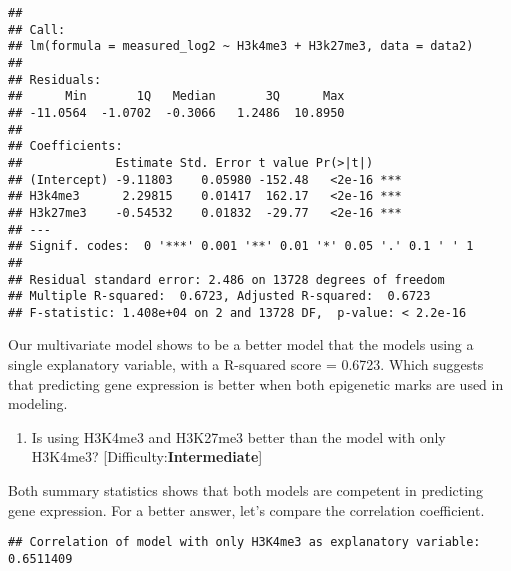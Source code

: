 \documentclass[
]{article}
\newenvironment{Shaded}{\begin{snugshade}}{\end{snugshade}}
\newcommand{\FunctionTok}[1]{\textcolor[rgb]{0.00,0.00,0.00}{#1}}
\newcommand{\NormalTok}[1]{#1}
\newcommand{\OtherTok}[1]{\textcolor[rgb]{0.56,0.35,0.01}{#1}}
\newcommand{\SpecialCharTok}[1]{\textcolor[rgb]{0.00,0.00,0.00}{#1}}
\newcommand{\StringTok}[1]{\textcolor[rgb]{0.31,0.60,0.02}{#1}}
\providecommand{\tightlist}{%
  \setlength{\itemsep}{0pt}\setlength{\parskip}{0pt}}
\begin{document}
\begin{verbatim}
## 
## Call:
## lm(formula = measured_log2 ~ H3k4me3 + H3k27me3, data = data2)
## 
## Residuals:
##      Min       1Q   Median       3Q      Max 
## -11.0564  -1.0702  -0.3066   1.2486  10.8950 
## 
## Coefficients:
##             Estimate Std. Error t value Pr(>|t|)    
## (Intercept) -9.11803    0.05980 -152.48   <2e-16 ***
## H3k4me3      2.29815    0.01417  162.17   <2e-16 ***
## H3k27me3    -0.54532    0.01832  -29.77   <2e-16 ***
## ---
## Signif. codes:  0 '***' 0.001 '**' 0.01 '*' 0.05 '.' 0.1 ' ' 1
## 
## Residual standard error: 2.486 on 13728 degrees of freedom
## Multiple R-squared:  0.6723, Adjusted R-squared:  0.6723 
## F-statistic: 1.408e+04 on 2 and 13728 DF,  p-value: < 2.2e-16
\end{verbatim}

Our multivariate model shows to be a better model that the models using
a single explanatory variable, with a R-squared score = 0.6723. Which
suggests that predicting gene expression is better when both epigenetic
marks are used in modeling.

\begin{enumerate}
\def\labelenumi{\arabic{enumi}.}
\setcounter{enumi}{9}
\tightlist
\item
  Is using H3K4me3 and H3K27me3 better than the model with only H3K4me3?
  {[}Difficulty:\textbf{Intermediate}{]}
\end{enumerate}

Both summary statistics shows that both models are competent in
predicting gene expression. For a better answer, let's compare the
correlation coefficient.

\begin{Shaded}
\end{Shaded}

\begin{verbatim}
## Correlation of model with only H3K4me3 as explanatory variable:  0.6511409
\end{verbatim}
\end{document}
